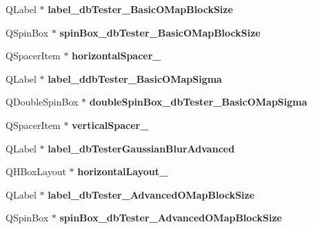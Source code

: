 \begin{DoxyCompactItemize}
\mbox{\label{class_ui___main_window_a2b4dc42c69f61532dd9177c4e345060f}} 
Q\+Label $\ast$ {\bfseries label\+\_\+db\+Tester\+\_\+\+Basic\+O\+Map\+Block\+Size}
\item 
\mbox{\label{class_ui___main_window_a3e773a1a88150e33ff7fb493c800de28}} 
Q\+Spin\+Box $\ast$ {\bfseries spin\+Box\+\_\+db\+Tester\+\_\+\+Basic\+O\+Map\+Block\+Size}
\item 
\mbox{\label{class_ui___main_window_abbed496dbaf0c1a9e78d2a954cd2da88}} 
Q\+Spacer\+Item $\ast$ {\bfseries horizontal\+Spacer\+\_}
\item 
\mbox{\label{class_ui___main_window_af9180518cd25480fcb461c94e63409ac}} 
Q\+Label $\ast$ {\bfseries label\+\_\+ddb\+Tester\+\_\+\+Basic\+O\+Map\+Sigma}
\item 
\mbox{\label{class_ui___main_window_a458ea7f8ea42bfcddb53107813a2414f}} 
Q\+Double\+Spin\+Box $\ast$ {\bfseries double\+Spin\+Box\+\_\+db\+Tester\+\_\+\+Basic\+O\+Map\+Sigma}
\item 
\mbox{\label{class_ui___main_window_ac554123dda4b7f53eaf995feecef2aa1}} 
Q\+Spacer\+Item $\ast$ {\bfseries vertical\+Spacer\+\_}
\item 
\mbox{\label{class_ui___main_window_a1c5a409d9cfe8e0e3a640249db289a15}} 
Q\+Label $\ast$ {\bfseries label\+\_\+db\+Tester\+Gaussian\+Blur\+Advanced}
\item 
\mbox{\label{class_ui___main_window_af6d4b60faf9c3f9e4dabfb84f8234dc8}} 
Q\+H\+Box\+Layout $\ast$ {\bfseries horizontal\+Layout\+\_}
\item 
\mbox{\label{class_ui___main_window_aac4f3831e5750bb8b85ece0df6b0aac5}} 
Q\+Label $\ast$ {\bfseries label\+\_\+db\+Tester\+\_\+\+Advanced\+O\+Map\+Block\+Size}
\item 
\mbox{\label{class_ui___main_window_aa888358fa16ce0c70f2624d48cba8373}} 
Q\+Spin\+Box $\ast$ {\bfseries spin\+Box\+\_\+db\+Tester\+\_\+\+Advanced\+O\+Map\+Block\+Size}

\end{DoxyCompactItemize}

